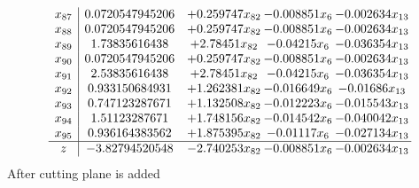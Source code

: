 \documentclass[11pt]{article}
\begin{document}
\[\begin{array}{c| c c@{\hskip 2pt} c@{\hskip 2pt} c@{\hskip 2pt} }
 x_{87}   &  0.0720547945206 & + 0.259747 x_{82} & -0.008851 x_{6} & -0.002634 x_{13}\\
 x_{88}   &  0.0720547945206 & + 0.259747 x_{82} & -0.008851 x_{6} & -0.002634 x_{13}\\
 x_{89}   &  1.73835616438 & + 2.78451 x_{82} & -0.04215 x_{6} & -0.036354 x_{13}\\
 x_{90}   &  0.0720547945206 & + 0.259747 x_{82} & -0.008851 x_{6} & -0.002634 x_{13}\\
 x_{91}   &  2.53835616438 & + 2.78451 x_{82} & -0.04215 x_{6} & -0.036354 x_{13}\\
 x_{92}   &  0.933150684931 & + 1.262381 x_{82} & -0.016649 x_{6} & -0.01686 x_{13}\\
 x_{93}   &  0.747123287671 & + 1.132508 x_{82} & -0.012223 x_{6} & -0.015543 x_{13}\\
 x_{94}   &  1.51123287671 & + 1.748156 x_{82} & -0.014542 x_{6} & -0.040042 x_{13}\\
 x_{95}   &  0.936164383562 & + 1.875395 x_{82} & -0.01117 x_{6} & -0.027134 x_{13}\\
\hline
z    &  -3.82794520548 & -2.740253 x_{82} & -0.008851 x_{6} & -0.002634 x_{13}\\
\end{array}\]
 After cutting plane is added 
\end{document}
